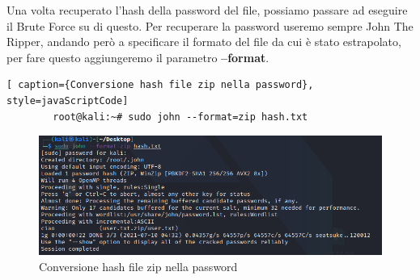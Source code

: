     Una volta recuperato l'hash della password del file, possiamo passare ad eseguire il Brute Force su di questo. Per recuperare la password useremo sempre John The Ripper, andando però a specificare il formato del file da cui è stato estrapolato, per fare questo aggiungeremo il parametro \textbf{--format}.  

    \begin{lstlisting}[ caption={Conversione hash file zip nella password}, style=javaScriptCode]
        root@kali:~# sudo john --format=zip hash.txt
    \end{lstlisting}

    \begin{figure}[h!]
        \centering
        \includegraphics[width=\linewidth]{Immagini/3/hash_ex_2.png}
        \caption{Conversione hash file zip nella password}
    \end{figure}